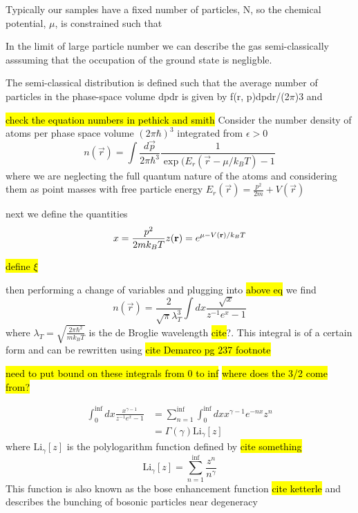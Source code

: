 Typically our samples have a fixed number of particles, N, so the chemical potential, $\mu$, is constrained such that

In the limit of large particle number we can describe the gas semi-classically asssuming that the occupation of the ground state is negligble.

The semi-classical distribution is defined such that the average number of particles in the phase-space volume dpdr is given by f(r, p)dpdr/(2$\pi$)3 and

\hl{check the equation numbers in pethick and smith}
Consider the number density of atoms per phase space volume $(2 \pi \hbar)^3$ integrated from $\epsilon > 0$
\begin{equation}
	n(\vec{r}) = \int \frac{d\vec{p}}{2\pi\hbar^3}\frac{1}{\exp(E_r(\vec{r} - \mu/k_BT) - 1}
\end{equation}
where we are neglecting the full quantum nature of the atoms and considering them as point masses with free particle energy $E_r(\vec{r}) = \frac{p^2}{2m} + V(\vec{r})$

next we define the quantities 
\begin{equation}
x=\frac{p^2}{2mk_BT} \\
z(\vec{r}) = e^{\mu - V(\vec{r})/k_BT}
\end{equation}

\hl{define $\xi$}

then performing a change of variables and plugging into \hl{above eq} we find
	\begin{equation}
	n(\vec{r}) = \frac{2}{\sqrt{\pi} \lambda_T^3}\int dx \frac{\sqrt{x}}{z^{-1}e^x-1}
	\end{equation}
where $\lambda_T = \sqrt{\frac{2 \pi \hbar^2}{m k_B T}}$ is the de Broglie wavelength \hl{cite}?. This integral is of a certain form and can be rewritten using \hl{cite Demarco pg 237 footnote}

\hl{need to put bound on these integrals from 0 to inf}
\hl{where does the 3/2 come from?}

	\begin{equation}
	\begin{split}
	\int_0^{\inf}dx\frac{x^{\gamma-1}}{z^{-1}e^x-1} &= \sum_{n=1}^{\inf}\int_0^{\inf}dx x^{\gamma-1}e^{-nx}z^n \\
	&=\Gamma(\gamma)\text{Li}_{\gamma}[z]
	\end{split}
	\end{equation}
where $\text{Li}_{\gamma}[z]$ is the polylogarithm function defined by \hl{cite something}
	\begin{equation} \label{eq:polylog_def}
	\text{Li}_{\gamma}[z] = \sum_{n=1}^{\inf}\frac{z^n}{n^{\gamma}}
	\end{equation}
This function is also known as the bose enhancement function \hl{cite ketterle} and describes the bunching of bosonic particles near degeneracy

